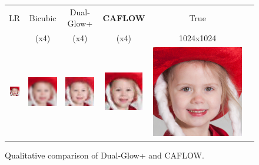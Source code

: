 \begin{figure}[h!]
    \begin{center}
    \setlength{\tabcolsep}{0pt}
    \begin{tabular}{cccccc}
        \scriptsize LR   &  \scriptsize Bicubic & \scriptsize Dual-Glow+    &  \scriptsize  \textbf{CAFLOW}     & \scriptsize True \\
          & (x4) & (x4)    & (x4) & 1024x1024 \\
    
    \includegraphics[width=0.18\linewidth]{Chapter1/paper_graphs/super_resolution/LR.jpg} &
    \includegraphics[width=0.18\linewidth]{Chapter1/paper_graphs/super_resolution/BICUBIC.jpg} &
    \includegraphics[width=0.18\linewidth]{Chapter1/paper_graphs/super_resolution/Dual-Glow.png} &
    \includegraphics[width=0.18\linewidth]{Chapter1/paper_graphs/super_resolution/CAFLOW.png} &
    \includegraphics[width=0.18\linewidth]{Chapter1/paper_graphs/super_resolution/TRUE.jpg} \\
    
    \end{tabular}
    \caption{Qualitative comparison of Dual-Glow+ and CAFLOW.}
    \label{ch1:fig:ablation}
    \end{center}
\end{figure}

